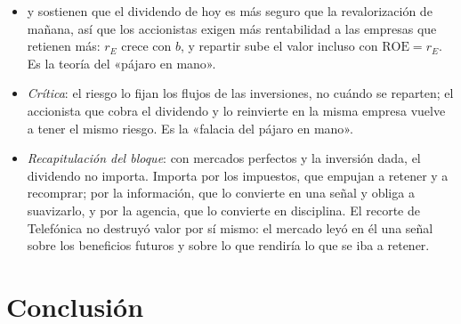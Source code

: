 \documentclass[11pt]{article}
\begin{document}
\begin{itemize}
\item \textcite{Gordon1959Dividends} y \textcite{Lintner1962Dividends} sostienen que el dividendo de hoy es más seguro que la revalorización de mañana, así que los accionistas exigen más rentabilidad a las empresas que retienen más: $r_E$ crece con $b$, y repartir sube el valor incluso con $\mathrm{ROE}=r_E$\nocite{Gordon1963Optimal}. Es la teoría del «pájaro en mano».
\item \emph{Crítica}: el riesgo lo fijan los flujos de las inversiones, no cuándo se reparten; el accionista que cobra el dividendo y lo reinvierte en la misma empresa vuelve a tener el mismo riesgo. Es la «falacia del pájaro en mano»\nocite{MillerModigliani1961Dividend,Bhattacharya1979Imperfect}.
\item \emph{Recapitulación del bloque}: con mercados perfectos y la inversión dada, el dividendo no importa. Importa por los impuestos, que empujan a retener y a recomprar; por la información, que lo convierte en una señal y obliga a suavizarlo, y por la agencia, que lo convierte en disciplina. El recorte de Telefónica no destruyó valor por sí mismo: el mercado leyó en él una señal sobre los beneficios futuros y sobre lo que rendiría lo que se iba a retener.
\end{itemize}

\section*{Conclusión}
\end{document}
